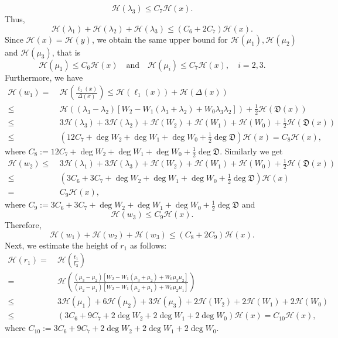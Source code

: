 \documentclass[12pt]{amsart}
\begin{document}
\[
\mathcal{H}(\lambda_3)\leq C_7\mathcal{H}(x).
\]
Thus, 
\[
\mathcal{H}(\lambda_1)+\mathcal{H}(\lambda_2)+\mathcal{H}(\lambda_3)\leq (C_6+2C_7)\mathcal{H}(x).
\]
Since $\mathcal{H}(x)=\mathcal{H}(y)$, we obtain the same upper bound for $\mathcal{H}(\mu_1),\mathcal{H}(\mu_2)$ and $\mathcal{H}(\mu_3)$, that is
\begin{equation*}
    \mathcal{H}(\mu_1)\leq C_6 \mathcal{H}(x) \quad \text{and} \quad \mathcal{H}(\mu_i)\leq C_7 \mathcal{H}(x), \quad i=2,3.
\end{equation*}
Furthermore, we have
\begin{align*}
    \mathcal{H}(w_1)=&~\mathcal{H}\left(\frac{\ell_1(x)}{\Delta(x)}\right)
    \leq \mathcal{H}(\ell_1(x))+\mathcal{H}(\Delta(x))\\
    \leq &~ \mathcal{H}\left((\lambda_3-\lambda_2)[W_2-W_1(\lambda_3+\lambda_2)+W_0\lambda_3\lambda_2]\right)+ \frac{1}{2}\mathcal{H}(\mathfrak{D}(x))\\
    \leq &~ 3\mathcal{H}(\lambda_3)+3\mathcal{H}(\lambda_2)+\mathcal{H}(W_2)+\mathcal{H}(W_1)+\mathcal{H}(W_0)+\frac{1}{2}\mathcal{H}(\mathfrak{D}(x))\\
    \leq &~ \left(12 C_7+\deg W_2+\deg W_1+\deg W_0+\frac{1}{2} \deg \mathfrak{D} \right)\mathcal{H}(x)=C_8 \mathcal{H}(x),
\end{align*}
where $C_8:=12 C_7+\deg W_2+\deg W_1+\deg W_0+\frac{1}{2}\deg \mathfrak{D}$. Similarly we get
\begin{align*}
    \mathcal{H}(w_2)\leq&~ 3\mathcal{H}(\lambda_1)+3\mathcal{H}(\lambda_3)+\mathcal{H}(W_2)+\mathcal{H}(W_1)+\mathcal{H}(W_0)+\frac{1}{2}\mathcal{H}(\mathfrak{D}(x))\\
    \leq &~(3C_6+3C_7+\deg W_2+\deg W_1+\deg W_0+\frac{1}{2} \deg \mathfrak{D})\mathcal{H}(x)\\
    =& ~ C_9\mathcal{H}(x),
\end{align*}
where $C_9:=3C_6+3C_7+\deg W_2+\deg W_1+\deg W_0+\frac{1}{2} \deg \mathfrak{D}$ and
\[
\mathcal{H}(w_3)\leq C_9\mathcal{H}(x).
\] Therefore, 
\begin{equation*}
    \mathcal{H}(w_1)+\mathcal{H}(w_2)+\mathcal{H}(w_3)\leq (C_8+2C_9)\mathcal{H}(x).
\end{equation*}
Next, we estimate the height of $r_1$ as follows:
\begin{align*}
    \mathcal{H}(r_1)=&~ \mathcal{H}\left(\frac{t_1}{t_3}\right)\\
    =&~ \mathcal{H}\left( \frac{(\mu_3-\mu_2)[W_2-W_1(\mu_3+\mu_2)+W_0\mu_3\mu_2]}{(\mu_2-\mu_1)[W_2-W_1(\mu_2+\mu_1)+W_0\mu_2\mu_1]}\right)  \\
    \leq &~ 3\mathcal{H}(\mu_1)+6\mathcal{H}(\mu_2)+3\mathcal{H}(\mu_3)+2\mathcal{H}(W_2)+ 2\mathcal{H}(W_1)+2\mathcal{H}(W_0)\\
    \leq &~ (3C_6+9C_7+2\deg W_2+2\deg W_1+2\deg W_0  )\mathcal{H}(x)=C_{10}\mathcal{H}(x),
\end{align*}
where $C_{10}:=3C_6+9C_7+2\deg W_2+2\deg W_1+2\deg W_0  $. 
\end{document}
